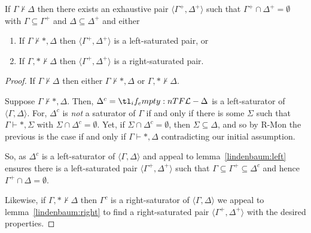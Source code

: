 \documentclass[10pt]{article}
\begin{document}
\begin{corollary}[Saturation]
  If \(\Gamma \nvdash \Delta\) then there exists an exhaustive pair \(\langle \Gamma^{+},\Delta^{+} \rangle\) such that \(\Gamma^{+} \cap \Delta^{+} = \emptyset\) with \(\Gamma \subseteq \Gamma^{+}\) and \(\Delta \subseteq \Delta^{+}\) and either
  \begin{enumerate}
  \item If \(\Gamma \nvdash \ast, \Delta\) then \(\langle \Gamma^{+},\Delta^{+} \rangle\) is a left-saturated pair, or
  \item If \(\Gamma,\ast \nvdash \Delta\) then \(\langle \Gamma^{+},\Delta^{+} \rangle\) is a right-saturated pair.
  \end{enumerate}
  \begin{proof}
    If \(\Gamma \nvdash \Delta\) then either \(\Gamma \nvdash \ast, \Delta\) or \(\Gamma, \ast \nvdash \Delta\).

    Suppose \(\Gamma \nvdash \ast, \Delta\).
    Then, \(\Delta^{c} = \olang{} - \Delta\) is a left-saturator of \(\langle \Gamma,\Delta \rangle\).
    For, \(\Delta^{c}\) is \emph{not} a saturator of \(\Gamma\) if and only if there is some \(\Sigma\) such that \(\Gamma \vdash \ast, \Sigma\) with \(\Sigma \cap \Delta^{c} = \emptyset\).
    Yet, if \(\Sigma \cap \Delta^{c} = \emptyset\), then \(\Sigma \subseteq \Delta\), and so by R-Mon the previous is the case if and only if \(\Gamma \vdash \ast, \Delta\) contradicting our initial assumption.

    So, as \(\Delta^{c}\) is a left-saturator of \(\langle  \Gamma, \Delta \rangle\) and appeal to lemma~\ref{lindenbaum:left} ensures there is a left-saturated pair \(\langle \Gamma^{+},\Delta^{+} \rangle\) such that \(\Gamma \subseteq \Gamma^{+} \subseteq \Delta^{c}\) and hence \(\Gamma^{+} \cap \Delta = \emptyset\).

    Likewise, if \(\Gamma, \ast \nvdash \Delta\) then \(\Gamma^{c}\) is a right-saturator of \(\langle \Gamma,\Delta \rangle\) we appeal to lemma~\ref{lindenbaum:right} to find a right-saturated pair \(\langle \Gamma^{+},\Delta^{+} \rangle\) with the desired properties.
  \end{proof}
\end{corollary}
\end{document}

